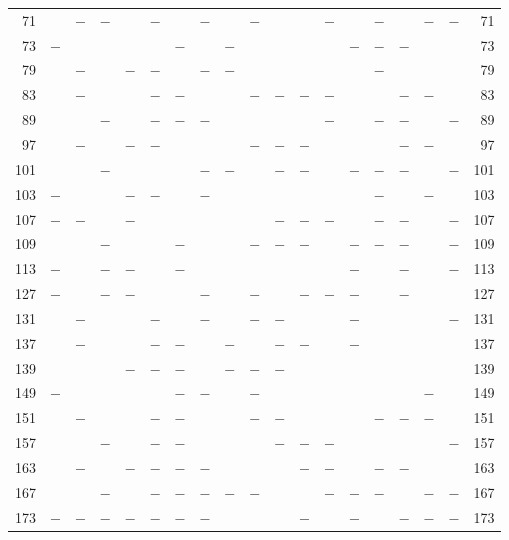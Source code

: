 \begin{center}
\begin{tabular}{r|c|c|c|c|c|c|c|c|c|c|c|c|c|c|c|c|c|r}
71 &  & $-$ & $-$ &  & $-$ &  & $-$ &  & $-$ &  &  & $-$ &  & $-$ &  & $-$ & $-$ & 71\\
73 & $-$ &  &  &  &  & $-$ &  & $-$ &  &  &  &  & $-$ & $-$ & $-$ &  &  & 73\\
79 &  & $-$ &  & $-$ & $-$ &  & $-$ & $-$ &  &  &  &  &  & $-$ &  &  &  & 79\\
83 &  & $-$ &  &  & $-$ & $-$ &  &  & $-$ & $-$ & $-$ & $-$ &  &  & $-$ & $-$ &  & 83\\
89 &  &  & $-$ &  & $-$ & $-$ & $-$ &  &  &  &  & $-$ &  & $-$ & $-$ &  & $-$ & 89\\
97 &  & $-$ &  & $-$ & $-$ &  &  &  & $-$ & $-$ & $-$ &  &  &  & $-$ & $-$ &  & 97\\
101 &  &  & $-$ &  &  &  & $-$ & $-$ &  & $-$ & $-$ &  & $-$ & $-$ & $-$ &  & $-$ & 101\\
103 & $-$ &  &  & $-$ & $-$ &  & $-$ &  &  &  &  &  &  & $-$ &  & $-$ &  & 103\\
107 & $-$ & $-$ &  & $-$ &  &  &  &  &  & $-$ & $-$ & $-$ &  & $-$ & $-$ &  & $-$ & 107\\
109 &  &  & $-$ &  &  & $-$ &  &  & $-$ & $-$ & $-$ &  & $-$ & $-$ & $-$ &  & $-$ & 109\\
113 & $-$ &  & $-$ & $-$ &  & $-$ &  &  &  &  &  &  & $-$ &  & $-$ &  & $-$ & 113\\
127 & $-$ &  & $-$ & $-$ &  &  & $-$ &  & $-$ &  & $-$ & $-$ & $-$ &  & $-$ &  &  & 127\\
131 &  & $-$ &  &  & $-$ &  & $-$ &  & $-$ & $-$ &  &  & $-$ &  &  &  & $-$ & 131\\
137 &  & $-$ &  &  & $-$ & $-$ &  & $-$ &  & $-$ & $-$ &  & $-$ &  &  &  &  & 137\\
139 &  &  &  & $-$ & $-$ & $-$ &  & $-$ & $-$ & $-$ &  &  &  &  &  &  &  & 139\\
149 & $-$ &  &  &  &  & $-$ & $-$ &  & $-$ &  &  &  &  &  &  & $-$ &  & 149\\
151 &  & $-$ &  &  & $-$ & $-$ &  &  & $-$ & $-$ &  &  &  & $-$ & $-$ & $-$ &  & 151\\
157 &  &  & $-$ &  & $-$ & $-$ &  &  &  & $-$ & $-$ & $-$ &  &  &  &  & $-$ & 157\\
163 &  & $-$ &  & $-$ & $-$ & $-$ & $-$ &  &  &  & $-$ & $-$ &  & $-$ & $-$ &  &  & 163\\
167 &  &  & $-$ &  & $-$ & $-$ & $-$ & $-$ & $-$ &  &  & $-$ & $-$ & $-$ &  & $-$ & $-$ & 167\\
173 & $-$ & $-$ & $-$ & $-$ & $-$ & $-$ & $-$ &  &  &  & $-$ &  & $-$ &  & $-$ & $-$ & $-$ & 173\\

\end{tabular}
\end{center}
